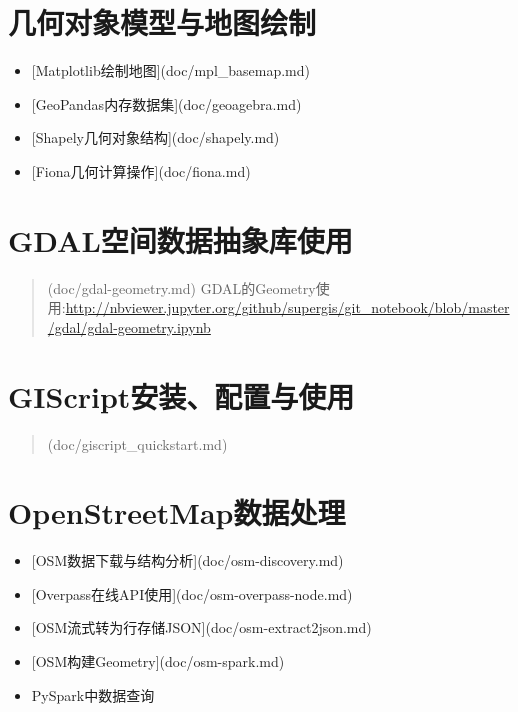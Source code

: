\documentclass[letterpaper,10pt,english]{sphinxmanual}
\begin{document}
\section{几何对象模型与地图绘制}
\label{index:id2}\begin{itemize}
\item {} 
{[}Matplotlib绘制地图{]}(doc/mpl\_basemap.md)

\item {} 
{[}GeoPandas内存数据集{]}(doc/geoagebra.md)

\item {} 
{[}Shapely几何对象结构{]}(doc/shapely.md)

\item {} 
{[}Fiona几何计算操作{]}(doc/fiona.md)

\end{itemize}


\section{GDAL空间数据抽象库使用}
\label{index:gdal}\begin{quote}

(doc/gdal-geometry.md)
GDAL的Geometry使用:\url{http://nbviewer.jupyter.org/github/supergis/git\_notebook/blob/master/gdal/gdal-geometry.ipynb}
\end{quote}


\section{GIScript安装、配置与使用}
\label{index:giscript}\begin{quote}

(doc/giscript\_quickstart.md)
\end{quote}


\section{OpenStreetMap数据处理}
\label{index:openstreetmap}\begin{itemize}
\item {} 
{[}OSM数据下载与结构分析{]}(doc/osm-discovery.md)

\item {} 
{[}Overpass在线API使用{]}(doc/osm-overpass-node.md)

\item {} 
{[}OSM流式转为行存储JSON{]}(doc/osm-extract2json.md)

\item {} 
{[}OSM构建Geometry{]}(doc/osm-spark.md)

\item {} 
PySpark中数据查询

\end{itemize}
\end{document}
